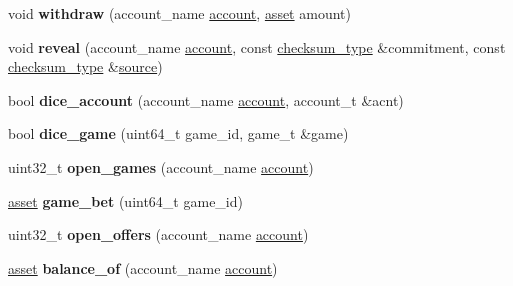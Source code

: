 \begin{DoxyCompactItemize}
\item 
\mbox{\label{structdice__tester_aca512b3d950f092b4dbf55c736215a2f}} 
void {\bfseries withdraw} (account\+\_\+name \mbox{\hyperlink{structaccount}{account}}, \mbox{\hyperlink{structaacio_1_1asset}{asset}} amount)
\item 
\mbox{\label{structdice__tester_a6937ed5fc6a40990af79655d52f314af}} 
void {\bfseries reveal} (account\+\_\+name \mbox{\hyperlink{structaccount}{account}}, const \mbox{\hyperlink{classfc_1_1sha256}{checksum\+\_\+type}} \&commitment, const \mbox{\hyperlink{classfc_1_1sha256}{checksum\+\_\+type}} \&\mbox{\hyperlink{structsource}{source}})
\item 
\mbox{\label{structdice__tester_a9c18214bf72b7c735524fc2b3470e099}} 
bool {\bfseries dice\+\_\+account} (account\+\_\+name \mbox{\hyperlink{structaccount}{account}}, account\+\_\+t \&acnt)
\item 
\mbox{\label{structdice__tester_a5fb984cab30aab874e78dbe7cd7736da}} 
bool {\bfseries dice\+\_\+game} (uint64\+\_\+t game\+\_\+id, game\+\_\+t \&game)
\item 
\mbox{\label{structdice__tester_a4ac4582dbd47d59ce21d5b9c19f04b34}} 
uint32\+\_\+t {\bfseries open\+\_\+games} (account\+\_\+name \mbox{\hyperlink{structaccount}{account}})
\item 
\mbox{\label{structdice__tester_a1f3403c99096fe801ddcfde008ddebd5}} 
\mbox{\hyperlink{structaacio_1_1asset}{asset}} {\bfseries game\+\_\+bet} (uint64\+\_\+t game\+\_\+id)
\item 
\mbox{\label{structdice__tester_a0701881d8d527663ad23118fea10c2a0}} 
uint32\+\_\+t {\bfseries open\+\_\+offers} (account\+\_\+name \mbox{\hyperlink{structaccount}{account}})
\item 
\mbox{\label{structdice__tester_a51945edecacc0061d50604f0bc31d74b}} 
\mbox{\hyperlink{structaacio_1_1asset}{asset}} {\bfseries balance\+\_\+of} (account\+\_\+name \mbox{\hyperlink{structaccount}{account}})
\item 
\mbox{\label{structdice__tester_a5b361ed8c37fc9035dfff5a53bce37a8}} 

\end{DoxyCompactItemize}
